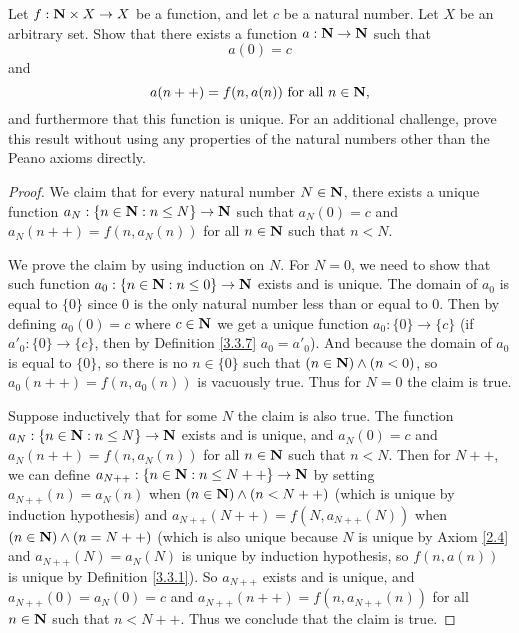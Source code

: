 \begin{exercise}\label{ex 3.5.12}
    Let \(f : \mathbf{N} \times X \to X\) be a function, and let \(c\) be a natural number.
    Let \(X\) be an arbitrary set.
    Show that there exists a function \(a : \mathbf{N} \to \mathbf{N}\) such that
    \[
        a(0) = c
    \]
    and
    \[
        a(n++) = f(n, a(n)) \text{ for all } n \in \mathbf{N},
    \]
    and furthermore that this function is unique.
    For an additional challenge, prove this result without using any properties of the natural numbers other than the Peano axioms directly.
\end{exercise}

\begin{proof}
    We claim that for every natural number \(N \in \mathbf{N}\), there exists a unique function \(a_N : \{n \in \mathbf{N} : n \leq N\} \to \mathbf{N}\) such that \(a_N(0) = c\) and \(a_N(n++) = f(n, a_{N}(n))\) for all \(n \in \mathbf{N}\) such that \(n < N\).

    We prove the claim by using induction on \(N\).
    For \(N = 0\), we need to show that such function \(a_0 : \{n \in \mathbf{N} : n \leq 0\} \to \mathbf{N}\) exists and is unique.
    The domain of \(a_0\) is equal to \(\{0\}\) since \(0\) is the only natural number less than or equal to \(0\).
    Then by defining \(a_0(0) = c\) where \(c \in \mathbf{N}\) we get a unique function \(a_0 : \{0\} \to \{c\}\) (if \(a'_0 : \{0\} \to \{c\}\), then by Definition \ref{3.3.7} \(a_0 = a'_0\)).
    And because the domain of \(a_0\) is equal to \(\{0\}\), so there is no \(n \in \{0\}\) such that \((n \in \mathbf{N}) \land (n < 0)\), so \(a_0(n++) = f(n, a_0(n))\) is vacuously true.
    Thus for \(N = 0\) the claim is true.

    Suppose inductively that for some \(N\) the claim is also true.
    The function \(a_N : \{n \in \mathbf{N} : n \leq N\} \to \mathbf{N}\) exists and is unique, and \(a_N(0) = c\) and \(a_N(n++) = f(n, a_N(n))\) for all \(n \in \mathbf{N}\) such that \(n < N\).
    Then for \(N++\), we can define \(a_{N++} : \{n \in \mathbf{N} : n \leq N++\} \to \mathbf{N}\) by setting \(a_{N++}(n) = a_N(n)\) when \((n \in \mathbf{N}) \land (n < N++)\) (which is unique by induction hypothesis) and \(a_{N++}(N++) = f(N, a_{N++}(N))\) when \((n \in \mathbf{N}) \land (n = N++)\) (which is also unique because \(N\) is unique by Axiom \ref{2.4} and \(a_{N++}(N) = a_N(N)\) is unique by induction hypothesis, so \(f(n, a(n))\) is unique by Definition \ref{3.3.1}).
    So \(a_{N++}\) exists and is unique, and \(a_{N++}(0) = a_N(0) = c\) and \(a_{N++}(n++) = f(n, a_{N++}(n))\) for all \(n \in \mathbf{N}\) such that \(n < N++\).
    Thus we conclude that the claim is true.


\end{proof}
